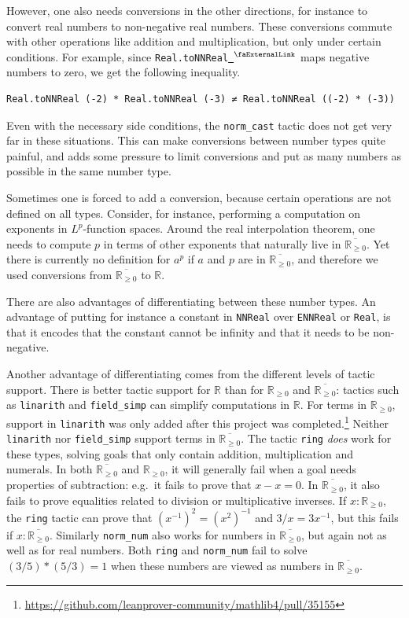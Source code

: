 \documentclass[12pt, reqno]{amsart}
\newcounter{lstlisting}[section]
\newcommand*{\real}{\mathbb{R}} %
\newcommand{\nnreal}{\real_{\ge0}}
\newcommand{\ennreal}{\overline{\real_{\ge0}}}
\newcommand{\extlink}{~\ensuremath{{}^\text{\faExternalLink}}}
\theoremstyle{definition}
\theoremstyle{plain}
\begin{document}
However, one also needs conversions in the other directions, for instance to convert real numbers to non-negative real numbers. These conversions commute with other operations like addition and multiplication, but only under certain conditions. For example, since \texttt{Real.toNNReal}\href{https://github.com/leanprover-community/mathlib4/blob/b63493a4746b4651fceb3bcf3a4651cc36a4b8de/Mathlib/Data/NNReal/Defs.lean#L154-L156}{\extlink} maps negative numbers to zero, we get the following inequality.
\begin{lstlisting}
Real.toNNReal (-2) * Real.toNNReal (-3) ≠ Real.toNNReal ((-2) * (-3))
\end{lstlisting}
Even with the necessary side conditions, the \texttt{norm\_cast} tactic does not get very far
in these situations.
This can make conversions between number types quite painful,
and adds some pressure to limit conversions and put as many numbers as possible in the same number type.

Sometimes one is forced to add a conversion, because certain operations are not defined on all types.
Consider, for instance, performing a computation on exponents in $L^p$-function spaces.
Around the real interpolation theorem, one needs to compute $p$ in terms of other exponents that
naturally live in $\ennreal$.
Yet there is currently no definition for $a^p$ if $a$ and $p$ are in $\ennreal$,
and therefore we used conversions from $\ennreal$ to $\real$.

There are also advantages of differentiating between these number types.
An advantage of putting for instance a constant in \texttt{NNReal} over \texttt{ENNReal} or
\texttt{Real}, is that it encodes that the constant cannot be infinity and that it needs to be non-negative.

Another advantage of differentiating comes from the different levels of tactic support.
There is better tactic support for $\real$ than for $\nnreal$ and $\ennreal$:
tactics such as \texttt{linarith} and \texttt{field\_simp} can simplify computations in $\real$.
For terms in $\nnreal$, support in \texttt{linarith} was only added after this project was completed.\footnote{\url{https://github.com/leanprover-community/mathlib4/pull/35155}}
Neither \texttt{linarith} nor \texttt{field\_simp} support terms in $\ennreal$.
The tactic \texttt{ring} \emph{does} work for these types, solving goals that only contain addition, multiplication and numerals.
In both $\ennreal$ and $\nnreal$, it will generally fail when a goal needs properties of subtraction: e.g.\ it fails to prove that $x - x = 0$.
In $\ennreal$, it also fails to prove equalities related to division or multiplicative inverses. If $x\colon \nnreal$, the \texttt{ring} tactic can prove that $(x^{-1})^2 = (x ^ 2)^{-1}$ and $3 / x = 3 x^{-1}$, but this fails if $x\colon \ennreal$.
Similarly \texttt{norm\_num} also works for numbers in $\ennreal$, but again not as well as for real numbers. Both \texttt{ring} and \texttt{norm\_num} fail to solve $(3/5) * (5/3) = 1$ when these numbers are viewed as numbers in $\ennreal$.
\end{document}
